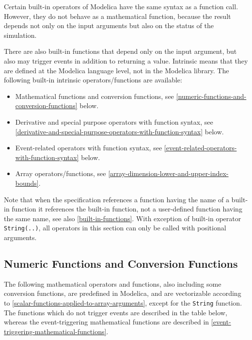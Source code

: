 Certain built-in operators of Modelica have the same syntax as a
function call. However, they do not behave as a mathematical function,
because the result depends not only on the input arguments but also on
the status of the simulation.

There are also built-in functions that depend only on the input
argument, but also may trigger events in addition to returning a value.
Intrinsic means that they are defined at the Modelica language level,
not in the Modelica library. The following built-in intrinsic
operators/functions are available:

\begin{itemize}
\item
  Mathematical functions and conversion functions, see \autoref{numeric-functions-and-conversion-functions}
  below.
\item
  Derivative and special purpose operators with function syntax, see
  \autoref{derivative-and-special-purpose-operators-with-function-syntax} below.
\item
  Event-related operators with function syntax, see \autoref{event-related-operators-with-function-syntax} below.
\item
  Array operators/functions, see \autoref{array-dimension-lower-and-upper-index-bounds}.
\end{itemize}

Note that when the specification references a function having the name
of a built-in function it references the built-in function, not a
user-defined function having the same name, see also \autoref{built-in-functions}. With
exception of built-in operator \lstinline!String(..)!, all operators in this section
can only be called with positional arguments.

\subsection{Numeric Functions and Conversion Functions}

The following mathematical operators and functions, also including some
conversion functions, are predefined in Modelica, and are vectorizable
according to \autoref{scalar-functions-applied-to-array-arguments}, except for the \lstinline!String! function. The
functions which do not trigger events are described in the table below,
whereas the event-triggering mathematical functions are described in
\autoref{event-triggering-mathematical-functions}.

